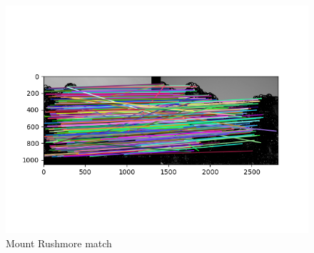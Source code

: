 \begin{figure}[h!]
\begin{minipage}[b]{0.3\textwidth}
        \includegraphics[width=\textwidth]{imgs/mt_rushmore3.png}
        \caption{Mount Rushmore match}
    \end{minipage}
    

\end{figure}
